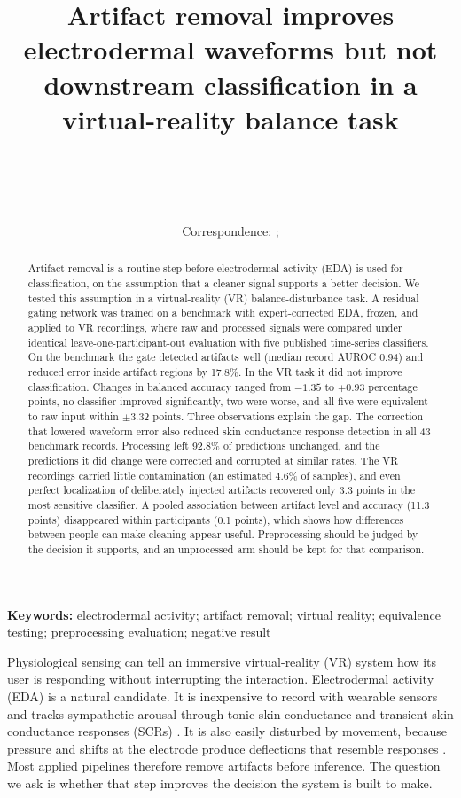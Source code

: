 \documentclass[10pt,twocolumn]{article}
\title{Artifact removal improves electrodermal waveforms but not downstream classification in a virtual-reality balance task}
\author{\AuthorNames\\\small \AuthorAffiliations\\\small \AuthorEmails\\\small \AuthorORCIDs\\\small Correspondence: \CorrespondingAuthor; \texttt{\CorrespondenceEmail}}
\date{}
\makeatletter
\renewcommand\section{\@startsection{section}{1}{\z@}{-2.5ex plus -0.5ex minus -0.2ex}{1.2ex plus 0.2ex}{\normalfont\large\bfseries}}
\makeatother
\begin{document}
\maketitle

\begin{abstract}
\normalsize
Artifact removal is a routine step before electrodermal activity (EDA) is used for classification, on the assumption that a cleaner signal supports a better decision. We tested this assumption in a virtual-reality (VR) balance-disturbance task. A residual gating network was trained on a benchmark with expert-corrected EDA, frozen, and applied to VR recordings, where raw and processed signals were compared under identical leave-one-participant-out evaluation with five published time-series classifiers. On the benchmark the gate detected artifacts well (median record AUROC 0.94) and reduced error inside artifact regions by 17.8\%. In the VR task it did not improve classification. Changes in balanced accuracy ranged from $-1.35$ to $+0.93$ percentage points, no classifier improved significantly, two were worse, and all five were equivalent to raw input within $\pm3.32$ points. Three observations explain the gap. The correction that lowered waveform error also reduced skin conductance response detection in all 43 benchmark records. Processing left 92.8\% of predictions unchanged, and the predictions it did change were corrected and corrupted at similar rates. The VR recordings carried little contamination (an estimated 4.6\% of samples), and even perfect localization of deliberately injected artifacts recovered only 3.3 points in the most sensitive classifier. A pooled association between artifact level and accuracy (11.3 points) disappeared within participants (0.1 points), which shows how differences between people can make cleaning appear useful. Preprocessing should be judged by the decision it supports, and an unprocessed arm should be kept for that comparison.
\end{abstract}
\noindent\textbf{Keywords:} electrodermal activity; artifact removal; virtual reality; equivalence testing; preprocessing evaluation; negative result

\section{Introduction}
Physiological sensing can tell an immersive virtual-reality (VR) system how its user is responding without interrupting the interaction. Electrodermal activity (EDA) is a natural candidate. It is inexpensive to record with wearable sensors and tracks sympathetic arousal through tonic skin conductance and transient skin conductance responses (SCRs) \citep{tronstad2022eda,boucsein2012recommendations,posadaquintero2020pipeline}. It is also easily disturbed by movement, because pressure and shifts at the electrode produce deflections that resemble responses \citep{bari2026artifacts,taylor2015edaexplorer}. Most applied pipelines therefore remove artifacts before inference. The question we ask is whether that step improves the decision the system is built to make.
\end{document}
